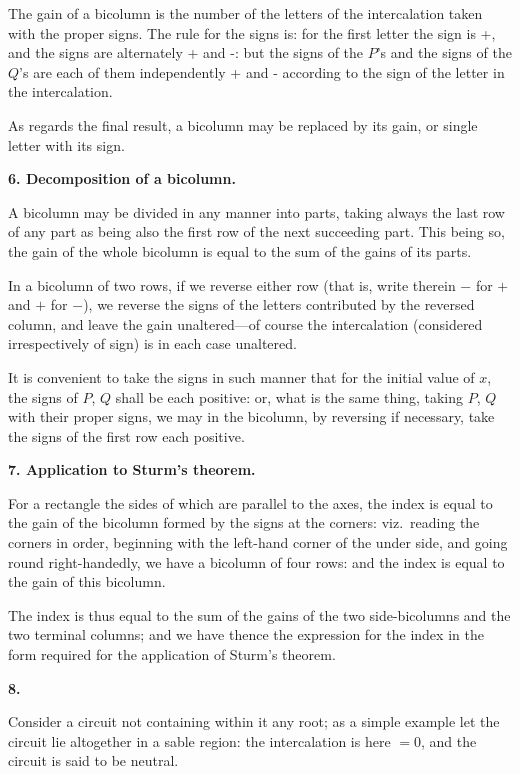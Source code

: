 \documentclass[11pt,a4paper]{book}
\begin{document}
The gain of a bicolumn is the number of the letters of the intercalation taken with the proper signs. The rule for the signs is: for the first letter the sign is +, and the signs are alternately + and -: but the signs of the $P$'s and the signs of the $Q$'s are each of them independently + and - according to the sign of the letter in the intercalation.

As regards the final result, a bicolumn may be replaced by its gain, or single letter with its sign.

\textbf{6. Decomposition of a bicolumn.}

A bicolumn may be divided in any manner into parts, taking always the last row of any part as being also the first row of the next succeeding part. This being so, the gain of the whole bicolumn is equal to the sum of the gains of its parts.

In a bicolumn of two rows, if we reverse either row (that is, write therein $-$ for $+$ and $+$ for $-$), we reverse the signs of the letters contributed by the reversed column, and leave the gain unaltered---of course the intercalation (considered irrespectively of sign) is in each case unaltered.

It is convenient to take the signs in such manner that for the initial value of $x$, the signs of $P$, $Q$ shall be each positive: or, what is the same thing, taking $P$, $Q$ with their proper signs, we may in the bicolumn, by reversing if necessary, take the signs of the first row each positive.

\textbf{7. Application to Sturm's theorem.}

For a rectangle the sides of which are parallel to the axes, the index is equal to the gain of the bicolumn formed by the signs at the corners: viz.\ reading the corners in order, beginning with the left-hand corner of the under side, and going round right-handedly, we have a bicolumn of four rows: and the index is equal to the gain of this bicolumn.

\newpage
\setcounter{page}{24}

The index is thus equal to the sum of the gains of the two side-bicolumns and the two terminal columns; and we have thence the expression for the index in the form required for the application of Sturm's theorem.

\textbf{8.}

Consider a circuit not containing within it any root; as a simple example let the circuit lie altogether in a sable region: the intercalation is here $= 0$, and the circuit is said to be neutral.
\end{document}
